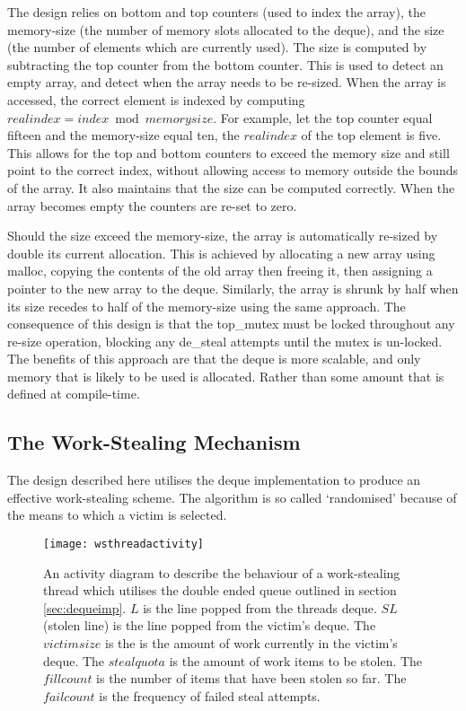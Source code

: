The design relies on bottom and top counters (used to index the array), the memory-size (the number of memory slots allocated to the deque), and 
the size (the number of elements which are currently used). The size is computed by subtracting the top counter from the bottom counter. 
This is used to detect an empty array, and detect when the array needs to be re-sized.
When the array is accessed, the correct element is indexed by computing \(realindex = index \bmod memorysize \). 
For example, let the top counter equal fifteen and the memory-size equal ten, the \(realindex\) of the top element is five.
This allows for the top and bottom counters to exceed the memory size and still point to the correct index, without allowing access to memory outside the 
bounds of the array. It also maintains that the size can be computed correctly. When the array becomes empty the counters are re-set to zero.

Should the size exceed the memory-size, the array is automatically re-sized by double its current allocation. 
This is achieved by allocating a new array using malloc, copying the contents of the old array then freeing it, 
then assigning a pointer to the new array to the deque. 
Similarly, the array is shrunk by half when its size recedes to half of the memory-size using the same approach.
The consequence of this design is that the top\_mutex must be locked throughout any re-size operation, blocking any de\_steal
attempts until the mutex is un-locked. 
The benefits of this approach are that the deque is more scalable, and only memory that is likely to be used is allocated.
Rather than some amount that is defined at compile-time.

\subsection{The Work-Stealing Mechanism}

The design described here utilises the deque implementation to produce an effective work-stealing scheme.
The algorithm is so called `randomised' because of the means to which a victim is selected.

\begin{figure}[h]
\centering
\texttt{[image: wsthreadactivity]}
\caption{
An activity diagram to describe the behaviour of a work-stealing thread which utilises 
the double ended queue outlined in section \ref{sec:dequeimp}. 
\(L\) is the line popped from the threads deque. 
\(SL\) (stolen line) is the line popped from the victim's deque.
The \(victimsize\) is the is the amount of work currently in the victim's deque.
The \(stealquota\) is the amount of work items to be stolen.
The \(fillcount\) is the number of items that have been stolen so far.
The \(failcount\) is the frequency of failed steal attempts.
}
\label{fig:wsthreadactivity}
\end{figure}

